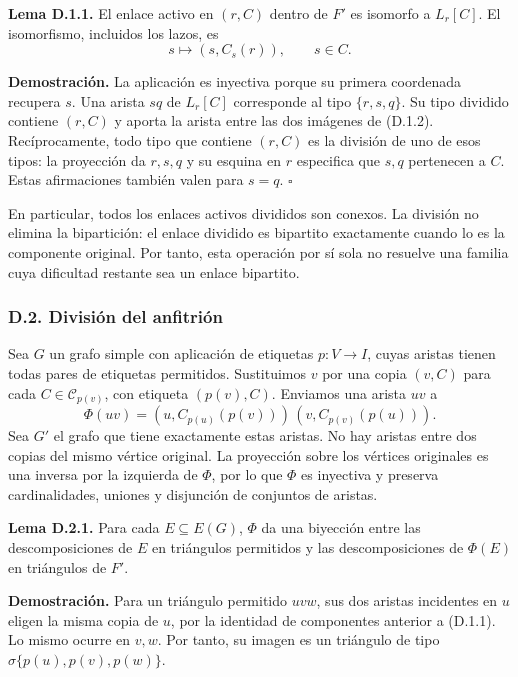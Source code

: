 \documentclass[spanish,11pt,a4paper]{article}
\begin{document}
\textbf{Lema D.1.1.} El enlace activo en \((r,C)\) dentro de \(F'\) es isomorfo a \(L_r[C]\). El isomorfismo, incluidos los lazos, es \[s\longmapsto (s,C_s(r)),\qquad s\in C.
\tag{D.1.2}\]

\textbf{Demostración.} La aplicación es inyectiva porque su primera coordenada recupera \(s\). Una arista \(sq\) de \(L_r[C]\) corresponde al tipo \(\{r,s,q\}\). Su tipo dividido contiene \((r,C)\) y aporta la arista entre las dos imágenes de (D.1.2). Recíprocamente, todo tipo que contiene \((r,C)\) es la división de uno de esos tipos: la proyección da \(r,s,q\) y su esquina en \(r\) especifica que \(s,q\) pertenecen a \(C\). Estas afirmaciones también valen para \(s=q\). \(\square\)

En particular, todos los enlaces activos divididos son conexos. La división no elimina la bipartición: el enlace dividido es bipartito exactamente cuando lo es la componente original. Por tanto, esta operación por sí sola no resuelve una familia cuya dificultad restante sea un enlace bipartito.

\subsubsection{D.2. División del anfitrión}\label{d.2.-divisiuxf3n-del-anfitriuxf3n}

Sea \(G\) un grafo simple con aplicación de etiquetas \(p:V\to I\), cuyas aristas tienen todas pares de etiquetas permitidos. Sustituimos \(v\) por una copia \((v,C)\) para cada \(C\in\mathcal C_{p(v)}\), con etiqueta \((p(v),C)\). Enviamos una arista \(uv\) a \[\Phi(uv)=
(u,C_{p(u)}(p(v)))\,(v,C_{p(v)}(p(u))).
\tag{D.2.1}\] Sea \(G'\) el grafo que tiene exactamente estas aristas. No hay aristas entre dos copias del mismo vértice original. La proyección sobre los vértices originales es una inversa por la izquierda de \(\Phi\), por lo que \(\Phi\) es inyectiva y preserva cardinalidades, uniones y disjunción de conjuntos de aristas.

\textbf{Lema D.2.1.} Para cada \(E\subseteq E(G)\), \(\Phi\) da una biyección entre las descomposiciones de \(E\) en triángulos permitidos y las descomposiciones de \(\Phi(E)\) en triángulos de \(F'\).

\textbf{Demostración.} Para un triángulo permitido \(uvw\), sus dos aristas incidentes en \(u\) eligen la misma copia de \(u\), por la identidad de componentes anterior a (D.1.1). Lo mismo ocurre en \(v,w\). Por tanto, su imagen es un triángulo de tipo \(\sigma\{p(u),p(v),p(w)\}\).
\end{document}
